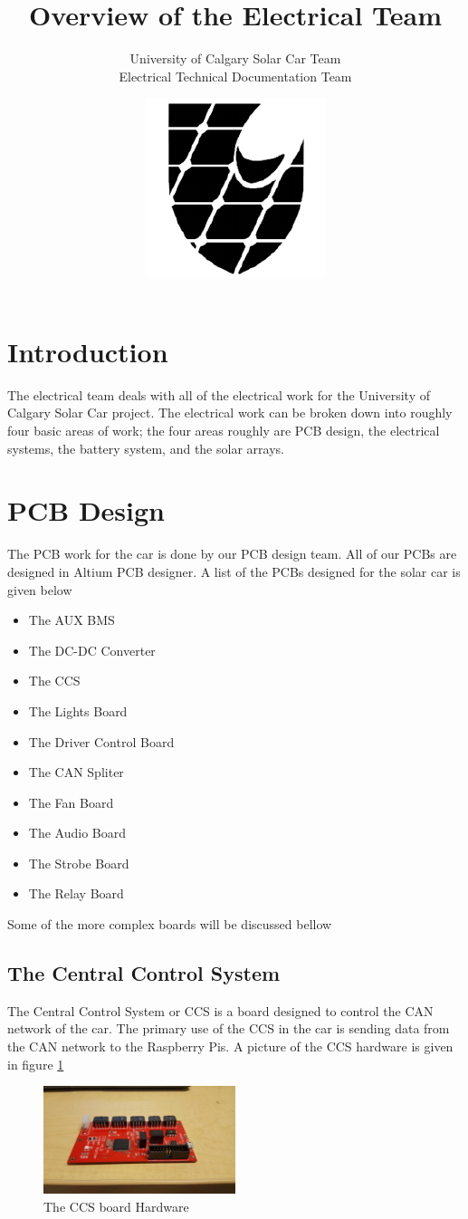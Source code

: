 \documentclass[titlepage]{article}
\title{Overview of the Electrical Team}
\author{University of Calgary Solar Car Team\\
        Electrical Technical Documentation Team}
\date{\includegraphics{images/logo.png}}
\begin{document}
    \maketitle

    \section{Introduction}
    The electrical team deals with all of the electrical work for the
    University of Calgary Solar Car project. The electrical work can be
    broken down into roughly four basic areas of work; the four areas
    roughly are PCB design, the electrical systems, the battery system,
    and the solar arrays. 
    \section{PCB Design}
    The PCB work for the car is done by our PCB design team. All of our
    PCBs are designed in Altium PCB designer. A list of the PCBs 
    designed for the solar car is given below
    \begin{itemize}
        \item The AUX BMS
        \item The DC-DC Converter
        \item The CCS
        \item The Lights Board
        \item The Driver Control Board
        \item The CAN Spliter
        \item The Fan Board
        \item The Audio Board
        \item The Strobe Board
        \item The Relay Board
    \end{itemize}
    Some of the more complex boards will be discussed bellow
    \subsection{The Central Control System}
    The Central Control System or CCS is a board designed to control the
    CAN network of the car. The primary use of the CCS in the car is 
    sending data from the CAN network to the Raspberry Pis. A picture of
    the CCS hardware is given in figure \ref{fig:css}
    \begin{figure}[H]
        \centering
        \includegraphics[width=0.5\textwidth]{images/ccs.jpg}
        \caption{The CCS board Hardware}
        \label{fig:css}
    \end{figure}
\end{document}
